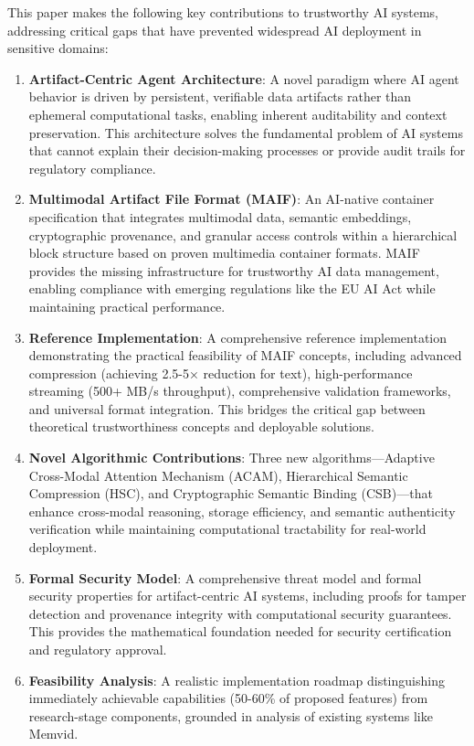 \documentclass[conference]{IEEEtran}
\begin{document}
This paper makes the following key contributions to trustworthy AI systems, addressing critical gaps that have prevented widespread AI deployment in sensitive domains:

\begin{enumerate}[leftmargin=*]
\item \textbf{Artifact-Centric Agent Architecture}: A novel paradigm where AI agent behavior is driven by persistent, verifiable data artifacts rather than ephemeral computational tasks, enabling inherent auditability and context preservation. This architecture solves the fundamental problem of AI systems that cannot explain their decision-making processes or provide audit trails for regulatory compliance.

\item \textbf{Multimodal Artifact File Format (MAIF)}: An AI-native container specification that integrates multimodal data, semantic embeddings, cryptographic provenance, and granular access controls within a hierarchical block structure based on proven multimedia container formats. MAIF provides the missing infrastructure for trustworthy AI data management, enabling compliance with emerging regulations like the EU AI Act while maintaining practical performance.

\item \textbf{Reference Implementation}: A comprehensive reference implementation demonstrating the practical feasibility of MAIF concepts, including advanced compression (achieving 2.5-5× reduction for text), high-performance streaming (500+ MB/s throughput), comprehensive validation frameworks, and universal format integration. This bridges the critical gap between theoretical trustworthiness concepts and deployable solutions.

\item \textbf{Novel Algorithmic Contributions}: Three new algorithms—Adaptive Cross-Modal Attention Mechanism (ACAM), Hierarchical Semantic Compression (HSC), and Cryptographic Semantic Binding (CSB)—that enhance cross-modal reasoning, storage efficiency, and semantic authenticity verification while maintaining computational tractability for real-world deployment.

\item \textbf{Formal Security Model}: A comprehensive threat model and formal security properties for artifact-centric AI systems, including proofs for tamper detection and provenance integrity with computational security guarantees. This provides the mathematical foundation needed for security certification and regulatory approval.

\item \textbf{Feasibility Analysis}: A realistic implementation roadmap distinguishing immediately achievable capabilities (50-60\% of proposed features) from research-stage components, grounded in analysis of existing systems like Memvid.
\end{enumerate}
\end{document}
